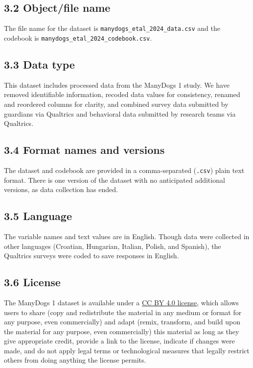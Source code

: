 \documentclass[
  pub,floatsintext]{apa6}
\begin{document}
\hypertarget{objectfile-name}{%
\subsection{3.2 Object/file name}\label{objectfile-name}}

The file name for the dataset is \texttt{manydogs\_etal\_2024\_data.csv} and the codebook is \texttt{manydogs\_etal\_2024\_codebook.csv}.

\hypertarget{data-type}{%
\subsection{3.3 Data type}\label{data-type}}

This dataset includes processed data from the ManyDogs 1 study. We have removed identifiable information, recoded data values for consistency, renamed and reordered columns for clarity, and combined survey data submitted by guardians via Qualtrics and behavioral data submitted by research teams via Qualtrics.

\hypertarget{format-names-and-versions}{%
\subsection{3.4 Format names and versions}\label{format-names-and-versions}}

The dataset and codebook are provided in a comma-separated (\texttt{.csv}) plain text format. There is one version of the dataset with no anticipated additional versions, as data collection has ended.

\hypertarget{language}{%
\subsection{3.5 Language}\label{language}}

The variable names and text values are in English. Though data were collected in other languages (Croatian, Hungarian, Italian, Polish, and Spanish), the Qualtrics surveys were coded to save responses in English.

\hypertarget{license}{%
\subsection{3.6 License}\label{license}}

The ManyDogs 1 dataset is available under a \href{https://creativecommons.org/licenses/by/4.0/}{CC BY 4.0 license}, which allows users to share (copy and redistribute the material in any medium or format for any purpose, even commercially) and adapt (remix, transform, and build upon the material for any purpose, even commercially) this material as long as they give appropriate credit, provide a link to the license, indicate if changes were made, and do not apply legal terms or technological measures that legally restrict others from doing anything the license permits.
\end{document}
